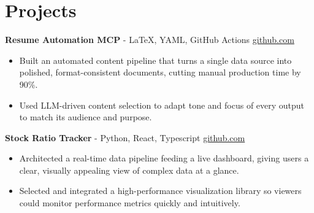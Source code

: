 \documentclass[11pt]{article}       %
\begin{document}
\vspace{-18.5pt}

\section*{Projects}

\textbf{Resume Automation MCP}{ - LaTeX, YAML, GitHub Actions} \hfill \href{https://github.com/Monica20030707/Tex_OrangeLeaf-mcp}{github.com} \\
\vspace{-9pt}
\begin{itemize}
  \item Built an automated content pipeline that turns a single data source into polished, format-consistent documents, cutting manual production time by 90\%.
  \item Used LLM-driven content selection to adapt tone and focus of every output to match its audience and purpose.
\end{itemize}

\textbf{Stock Ratio Tracker}{ - Python, React, Typescript} \hfill \href{https://github.com/Monica20030707/Trading-Dashboard_UI}{github.com} \\
\vspace{-9pt}
\begin{itemize}
  \item Architected a real-time data pipeline feeding a live dashboard, giving users a clear, visually appealing view of complex data at a glance.
  \item Selected and integrated a high-performance visualization library so viewers could monitor performance metrics quickly and intuitively.
\end{itemize}

\end{document}
